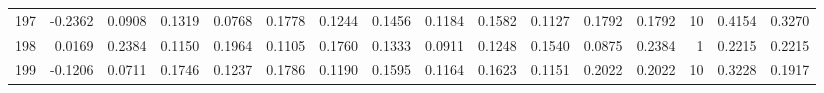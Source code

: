 \begin{tabular}{lrrrrrrrrrrrrrrr}
197 &     -0.2362 &  0.0908 &  0.1319 &  0.0768 &  0.1778 &  0.1244 &  0.1456 &  0.1184 &  0.1582 &  0.1127 &   0.1792 &     0.1792 &     10 &                    0.4154 &                     0.3270 \\
198 &      0.0169 &  0.2384 &  0.1150 &  0.1964 &  0.1105 &  0.1760 &  0.1333 &  0.0911 &  0.1248 &  0.1540 &   0.0875 &     0.2384 &      1 &                    0.2215 &                     0.2215 \\
199 &     -0.1206 &  0.0711 &  0.1746 &  0.1237 &  0.1786 &  0.1190 &  0.1595 &  0.1164 &  0.1623 &  0.1151 &   0.2022 &     0.2022 &     10 &                    0.3228 &                     0.1917 \\
\bottomrule
\end{tabular}
